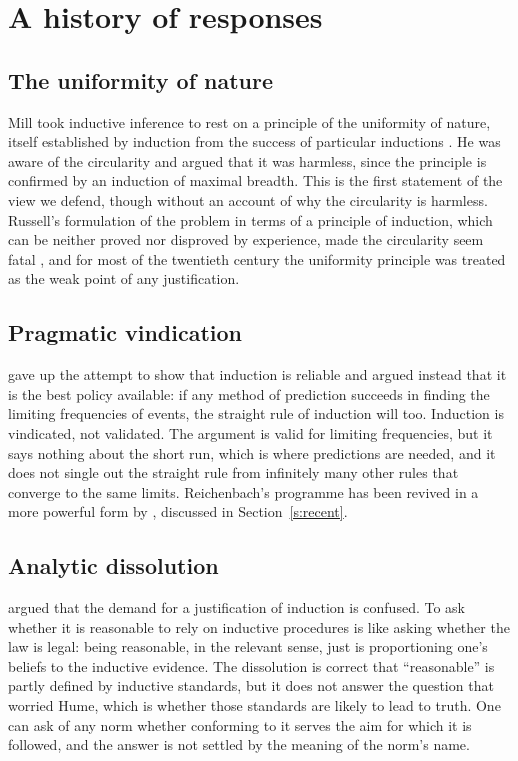 \documentclass{situationist-preprint}
\begin{document}
\section{A history of responses}

\subsection{The uniformity of nature}

Mill took inductive inference to rest on a principle of the uniformity of nature, itself established by induction from the success of particular inductions \citep[III.iii]{Mill1843}. He was aware of the circularity and argued that it was harmless, since the principle is confirmed by an induction of maximal breadth. This is the first statement of the view we defend, though without an account of why the circularity is harmless. Russell's formulation of the problem in terms of a principle of induction, which can be neither proved nor disproved by experience, made the circularity seem fatal \citep[ch.~6]{Russell1912}, and for most of the twentieth century the uniformity principle was treated as the weak point of any justification.

\subsection{Pragmatic vindication}

\citet{Reichenbach1938} gave up the attempt to show that induction is reliable and argued instead that it is the best policy available: if any method of prediction succeeds in finding the limiting frequencies of events, the straight rule of induction will too. Induction is vindicated, not validated. The argument is valid for limiting frequencies, but it says nothing about the short run, which is where predictions are needed, and it does not single out the straight rule from infinitely many other rules that converge to the same limits. Reichenbach's programme has been revived in a more powerful form by \citet{Schurz2019}, discussed in Section~\ref{s:recent}.

\subsection{Analytic dissolution}

\citet[ch.~9]{Strawson1952} argued that the demand for a justification of induction is confused. To ask whether it is reasonable to rely on inductive procedures is like asking whether the law is legal: being reasonable, in the relevant sense, just is proportioning one's beliefs to the inductive evidence. The dissolution is correct that \enquote{reasonable} is partly defined by inductive standards, but it does not answer the question that worried Hume, which is whether those standards are likely to lead to truth. One can ask of any norm whether conforming to it serves the aim for which it is followed, and the answer is not settled by the meaning of the norm's name.
\end{document}

